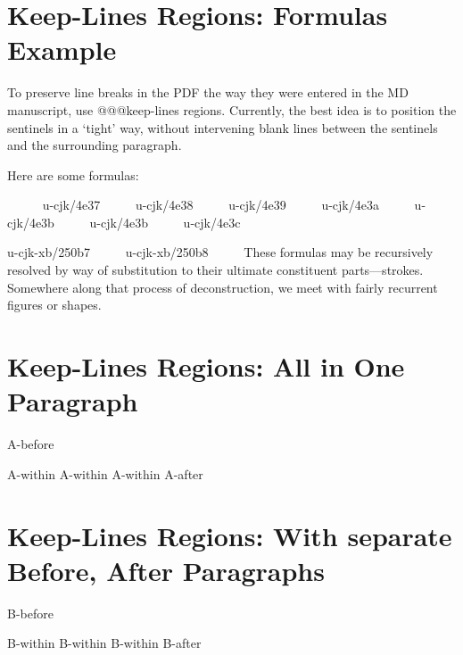 \section{Keep-Lines Regions: Formulas Example
}
\begin{multicols}{2}To preserve line breaks in the PDF the way they were entered in
the MD manuscript, use {\mktsStyleCode{}@@@keep-lines} regions. Currently, the
best idea is to position the sentinels in a ‘tight’ way, without
intervening blank lines between the sentinels and the surrounding
paragraph.\mktsShowpar\par
Here are some formulas:
\mktsShowpar\par
\begingroup{}     
{\mktsStyleCode{}u-cjk/4e37}     
{\mktsStyleCode{}u-cjk/4e38}     
{\mktsStyleCode{}u-cjk/4e39}     
{\mktsStyleCode{}u-cjk/4e3a}     
{\mktsStyleCode{}u-cjk/4e3b}     
{\mktsStyleCode{}u-cjk/4e3b}     
{\mktsStyleCode{}u-cjk/4e3c}     

{\mktsStyleCode{}u-cjk-xb/250b7}     
{\mktsStyleCode{}u-cjk-xb/250b8}     
\endgroup{}These formulas may be recursively resolved by way of substitution to their
ultimate constituent parts—strokes. Somewhere along that process of
deconstruction, we meet with fairly recurrent figures or shapes.\mktsShowpar\par
\end{multicols}
\section{Keep-Lines Regions: All in One Paragraph
}
\begin{multicols}{2}\end{multicols}A-before
\mktsShowpar\par
\begingroup\obeyalllines{}A-within
A-within
A-within
\endgroup{}A-after
\begin{multicols}{2}\end{multicols}
\section{Keep-Lines Regions: With separate Before, After Paragraphs
}
\begin{multicols}{2}\end{multicols}B-before\mktsShowpar\par
\begingroup\obeyalllines{}B-within
B-within
B-within
\endgroup{}B-after\mktsShowpar\par
\begin{multicols}{2}\end{multicols}

